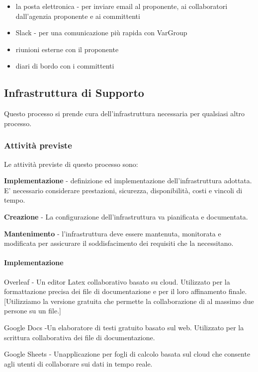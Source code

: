\documentclass[12pt, a4paper]{article}
\begin{document}
\begin{itemize}
\item
  la posta elettronica - per inviare email al proponente, ai
  collaboratori dall'agenzia proponente e ai committenti
\item
  Slack - per una comunicazione più rapida con VarGroup
\item
  riunioni esterne con il proponente
\item
  diari di bordo con i committenti
\end{itemize}

\subsection{Infrastruttura di Supporto}

Questo processo si prende cura dell'infrastruttura necessaria per
qualsiasi altro processo.

\subsubsection{Attività previste}

Le attività previste di questo processo sono:

\textbf{Implementazione} - definizione ed implementazione
dell'infrastruttura adottata. E' necessario considerare prestazioni,
sicurezza, disponibilità, costi e vincoli di tempo.

\textbf{Creazione} - La configurazione dell'infrastruttura va
pianificata e documentata.

\textbf{Mantenimento} - l'infrastruttura deve essere mantenuta,
monitorata e modificata per assicurare il soddisfacimento dei requisiti
che la necessitano.

\paragraph{Implementazione}

 {Overleaf} - Un editor Latex collaborativo basato su cloud.
Utilizzato per la formattazione precisa dei file di documentazione e per
il loro affinamento finale. {[}Utilizziamo la versione gratuita che
permette la collaborazione di al massimo due persone su un file.{]}

 {Google Docs} -Un elaboratore di testi gratuito basato sul web.
Utilizzato per la scrittura collaborativa dei file di documentazione.

 {Google Sheets} - Un\textquotesingle applicazione per fogli di
calcolo basata sul cloud che consente agli utenti di collaborare sui
dati in tempo reale.
\end{document}
